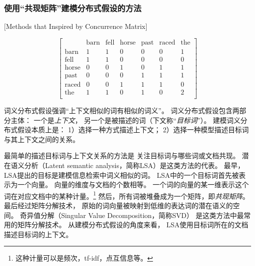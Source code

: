 \subsubsection{使用``共现矩阵''建模分布式假设的方法}[Methods that Inspired by Concurrence Matrix]\label{sec:intro:review:static-emb:matrix}
\begin{figure}[t]
	\wuhao
	\[
	\begin{bmatrix}
	 & \text{barn} & \text{fell} & \text{horse} & \text{past} & \text{raced} & \text{the} \\
	\text{barn} & 1 & 1 & 0  & 0 & 0 & 1 \\
	\text{fell} & 1 & 1 & 0  & 0 & 0 & 0 \\
	\text{horse} & 0 & 0 & 1  & 0 & 1 & 1 \\
	\text{past} & 0 & 0 & 0  & 1 & 1 & 1 \\
	\text{raced} & 0 & 0 & 1 & 1 & 1 & 0 \\
	\text{the} & 1 & 1 & 0  & 1 & 0 & 2 \\
	\end{bmatrix}
	\]
\end{figure}
词义分布式假设强调``上下文相似的词有相似的词义''。
词义分布式假设包含两部分主体：
一个是\textit{上下文}，
另一个是被描述的词（下文称``\textit{目标词}''）。
建模词义分布式假设本质上是：
1）选择一种方式描述上下文；
2）选择一种模型描述目标词与其上下文之间的关系。

最简单的描述目标词与上下文关系的方法是
关注目标词与哪些词或文档共现。
潜在语义分析（Latent semantic analysis，简称LSA）是这类方法的代表。
最早，LSA提出的目标是建模信息检索中词义相似的词。
LSA中的一个目标词首先被表示为一个向量。
向量的维度与文档的个数相等。
一个词的向量的某一维表示这个词在对应文档中的某种计量。\footnote{这种计量可以是频次，tf-idf，点互信息等。}
然后，所有词被堆叠成为一个矩阵，即\textit{共现矩阵}。
最后经过矩阵分解技术，
原始的词向量被映射到低维的表达词的潜在语义的空间。
奇异值分解（Singular Value Decomposition，简称SVD）
是这类方法中最常用的矩阵分解技术。
从建模分布式假设的角度来看，
LSA使用目标词所在的文档描述目标词的上下文。

